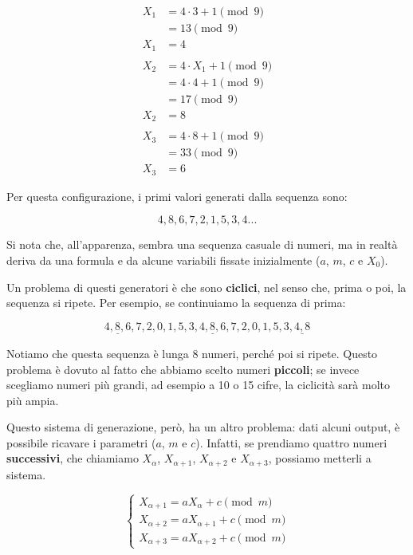 \documentclass{report}
\begin{document}
\begin{align*}
    X_1 &= 4 \cdot 3 + 1 \pmod{9} \\
        &= 13 \pmod{9} \\
    X_1  &= 4
    \\
    \\
    X_2 &= 4 \cdot X_1 + 1 \pmod{9} \\
        &= 4 \cdot 4 + 1 \pmod{9} \\
        &= 17 \pmod{9} \\
    X_2 &= 8 
    \\
    \\
    X_3 &= 4 \cdot 8 + 1 \pmod{9} \\
        &= 33 \pmod{9} \\
    X_3 &= 6
\end{align*}

Per questa configurazione, i primi valori generati dalla sequenza sono:

\begin{equation*}
    4, 8, 6, 7 ,2, 1, 5, 3, 4 ... 
\end{equation*}

Si nota che, all'apparenza, sembra una sequenza casuale di numeri, ma in realtà deriva da una formula e da alcune variabili fissate inizialmente ($a$, $m$, $c$ e $X_0$).

Un problema di questi generatori è che sono \textbf{ciclici}, nel senso che, prima o poi, la sequenza si ripete.  
Per esempio, se continuiamo la sequenza di prima:


\begin{equation*}
    \underline{4, 8, 6}, 7, 2, 0, 1, 5, 3, \underline{4, 8, 6}, 7, 2, 0, 1, 5, 3, \underline{4, 8}
\end{equation*}


Notiamo che questa sequenza è lunga 8 numeri, perché poi si ripete.  
Questo problema è dovuto al fatto che abbiamo scelto numeri \textbf{piccoli}; se invece scegliamo numeri più grandi, ad esempio a 10 o 15 cifre, la ciclicità sarà molto più ampia.


Questo sistema di generazione, però, ha un altro problema: dati alcuni output, è possibile ricavare i parametri ($a$, $m$ e $c$).  
Infatti, se prendiamo quattro numeri \textbf{successivi}, che chiamiamo $X_{\alpha}$, $X_{\alpha+1}$, $X_{\alpha+2}$ e $X_{\alpha+3}$, possiamo metterli a sistema.


\begin{equation*}
    \begin{cases}
        X_{\alpha+1} = aX_{\alpha} + c \pmod{m} \\
        X_{\alpha+2} = aX_{\alpha+1} + c \pmod{m} \\
        X_{\alpha+3} = aX_{\alpha+2} + c \pmod{m}
    \end{cases}
\end{equation*}
\end{document}

